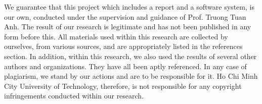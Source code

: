 We guarantee that this project which includes a report and a software system, is our own, conducted under the supervision and guidance of Prof. Truong Tuan Anh. The result of our research is legitimate and has not been published in any form before this. All materials used within this research are collected by ourselves, from various sources, and are appropriately listed in the references section. In addition, within this research, we also used the results of several other authors and organizations. They have all been aptly referenced. In any case of plagiarism, we stand by our actions and are to be responsible for it. Ho Chi Minh City University of Technology, therefore, is not responsible for any copyright infringements conducted within our research.